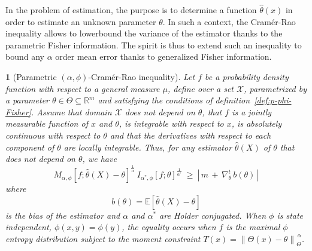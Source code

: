 \documentclass[english,sort&compress]{elsarticle}
\theoremstyle{definition}
\theoremstyle{plain}
\newtheorem{prop}{\protect\propositionname}
\theoremstyle{plain}
\providecommand{\propositionname}{Proposition}
\def\Rset{\mathbb{R}}
\def\X{\mathcal{X}}
\newcommand{\Esp}[1]{\mathbb{E}\left[ #1 \right]}
\begin{document}
In  the  problem  of  estimation,   the  purpose  is  to  determine  a  function
$\hat{\theta}(x)$ in order to estimate  an unknown parameter $\theta$. In such a
context, the  Cram\'er-Rao inequality allows  to lowerbound the variance  of the
estimator thanks  to the  parametric Fisher information.  The spirit is  thus to
extend  such an  inequality to  bound any  $\alpha$ order  mean error  thanks to
generalized Fisher information.
%
\begin{prop}[Parametric                              $(\alpha,\phi)$-Cram\'er-Rao
  inequality]\label{prop:p-phi-CR}
  Let $f$  be a probability density  function with respect to  a general measure
  $\mu$, define over a set $\X$,  parametrized by a parameter $\theta \in \Theta
  \subseteq      \Rset^m$     and      satisfying     the      conditions     of
  definition~\ref{def:p-phi-Fisher}. Assume that domain  $\X$ does not depend on
  $\theta$, that  $f$ is a jointly  measurable function of $x$  and $\theta$, is
  integrable  with respect  to $x$,  is  absolutely continuous  with respect  to
  $\theta$ and that  the derivatives with respect to  each component of $\theta$
  are  locally  integrable. Thus,  for  any  estimator $\widehat{\theta}(X)$  of
  $\theta$ that does not depend on $\theta$, we have
  \begin{equation}\label{eq:phi-CR}
  M_{\alpha,\phi} \! \left[ f ; \widehat{\theta}(X) - \theta
  \right]^{\frac{1}{\alpha}} \: I_{\alpha^*\!,\phi}[f;\theta]^{\frac{1}{\alpha^*}}
  \: \ge \: \left| \, m \, + \, \nabla_\theta^t \, b(\theta) \, \right|
  \end{equation}
  where
  \begin{equation}
  b(\theta) = \Esp{\widehat{\theta}(X) - \theta}
  \end{equation}
  is  the  bias  of  the  estimator  and  $\alpha$  and  $\alpha^*$  are  Holder
  conjugated.   When $\phi$  is state  independent, $\phi(x,y)  =  \phi(y)$, the
  equality occurs when $f$ is the maximal $\phi$ entropy distribution subject to
  the moment constraint $T(x) = \left\| \Theta(x) - \theta \right\|_{\Theta}^{\,
    \alpha}$.
\end{prop}
%
\end{document}
